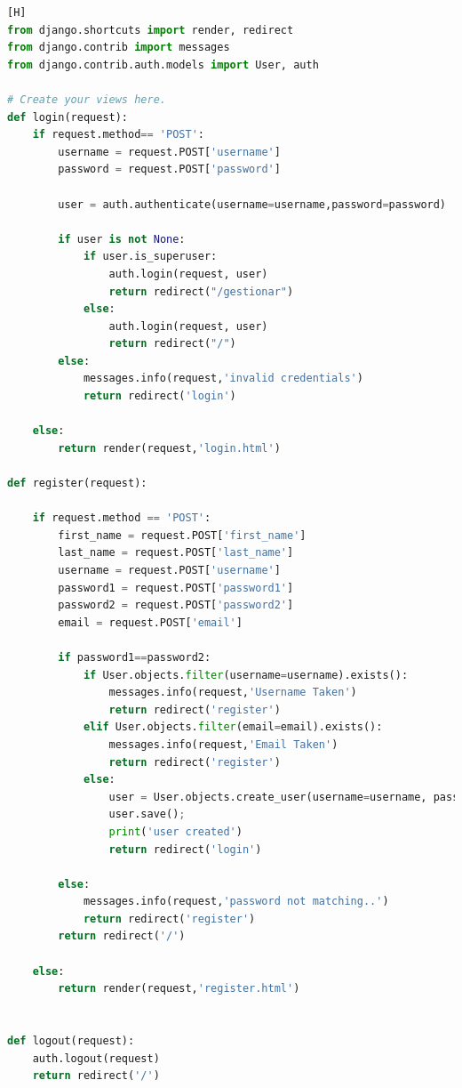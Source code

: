 \documentclass{article}
\begin{document}
	\begin{lstlisting}[language=Python,caption={Codigo de views.py de accounts}][H]
from django.shortcuts import render, redirect
from django.contrib import messages
from django.contrib.auth.models import User, auth

# Create your views here.
def login(request):
    if request.method== 'POST':
        username = request.POST['username']
        password = request.POST['password']

        user = auth.authenticate(username=username,password=password)

        if user is not None:
            if user.is_superuser:
                auth.login(request, user)
                return redirect("/gestionar")   
            else:
                auth.login(request, user)
                return redirect("/")
        else:
            messages.info(request,'invalid credentials')
            return redirect('login')

    else:
        return render(request,'login.html')    

def register(request):

    if request.method == 'POST':
        first_name = request.POST['first_name']
        last_name = request.POST['last_name']
        username = request.POST['username']
        password1 = request.POST['password1']
        password2 = request.POST['password2']
        email = request.POST['email']

        if password1==password2:
            if User.objects.filter(username=username).exists():
                messages.info(request,'Username Taken')
                return redirect('register')
            elif User.objects.filter(email=email).exists():
                messages.info(request,'Email Taken')
                return redirect('register')
            else:   
                user = User.objects.create_user(username=username, password=password1, email=email,first_name=first_name,last_name=last_name)
                user.save();
                print('user created')
                return redirect('login')

        else:
            messages.info(request,'password not matching..')    
            return redirect('register')
        return redirect('/')
        
    else:
        return render(request,'register.html')


def logout(request):
    auth.logout(request)
    return redirect('/')       
	\end{lstlisting}
\end{document}

